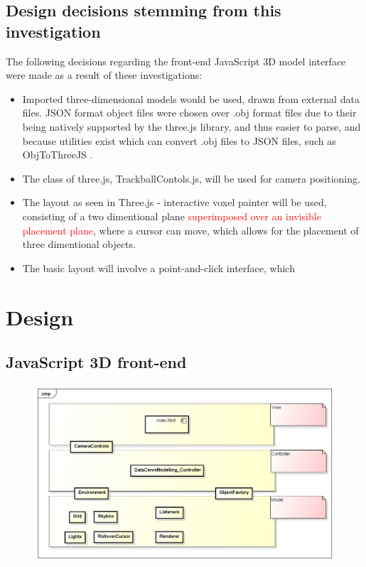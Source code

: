 \subsection{Design decisions stemming from this investigation}
\label{subSec: Three.js: Design decisions stemming from this investigation}

The following decisions regarding the front-end JavaScript 3D model interface were made as a result of these investigations:

\begin{itemize}
\item Imported three-dimensional models would be used, drawn from external data files. JSON format object files were chosen over .obj format files due to their being natively supported by the three.js library, and thus easier to parse, and because utilities exist which can convert .obj files to JSON files, such as Obj\textunderscore To\textunderscore ThreeJS \cite{ObjToJSON}.

\item The class of three.js, TrackballContols.js, will be used for camera positioning.

\item The layout as seen in Three.js - interactive voxel painter \cite{ThreeJSVoxelPainter} will be used, consisting of a two dimentional plane \textcolor{red}{superimposed over an invisible placement plane}, where a cursor can move, which allows for the placement of three dimentional objects.

\item The basic layout will involve a point-and-click interface, which  
\end{itemize}

\section{Design}
\label{sec:Design}

\subsection{JavaScript 3D front-end}

\begin{figure}[H]
\centering
\includegraphics[width=5in]{Resources//Design_Diagrams//Component_JavaScript 3D model.png}
\caption{}
\label{}
\end{figure}

